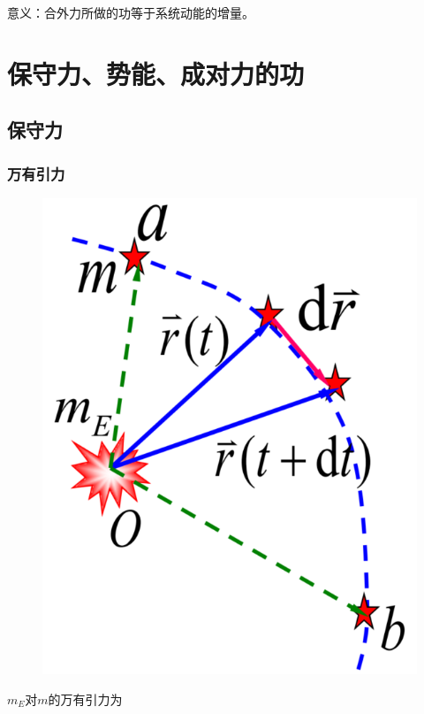 \documentclass[
	12pt, %
	a4paper, %
]{myLegrandOrangeBook}
\begin{document}
意义：合外力所做的功等于系统动能的增量。

\section{保守力、势能、成对力的功}

\subsection{保守力}

\subsubsection*{万有引力}

\begin{figure}
    \centering
    \includegraphics[scale=0.2]{"Chapter 03 images/pic4.png"}
    \label{pic4}
\end{figure}

\(m_{E}\)对\(m\)的万有引力为
\end{document}
